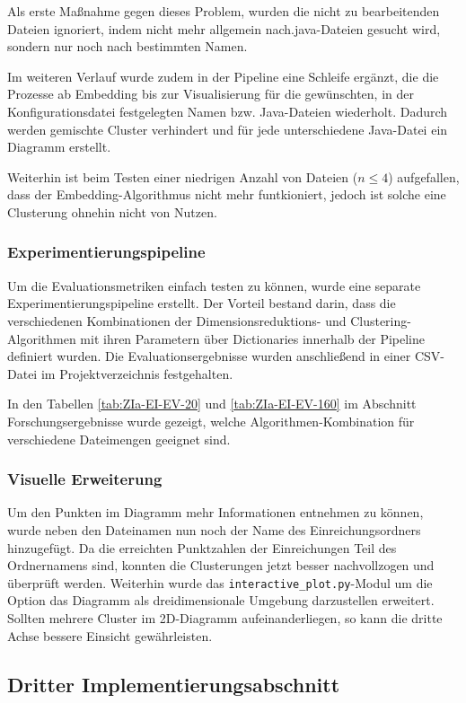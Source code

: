 Als erste Maßnahme gegen dieses Problem, wurden die nicht zu bearbeitenden Dateien ignoriert, indem nicht mehr allgemein nach.java-Dateien gesucht wird, sondern nur noch nach bestimmten Namen. 

Im weiteren Verlauf wurde zudem in der Pipeline eine Schleife ergänzt, die die Prozesse ab Embedding bis zur Visualisierung für die gewünschten, in der Konfigurationsdatei festgelegten Namen bzw. Java-Dateien wiederholt. Dadurch werden gemischte Cluster verhindert und für jede unterschiedene Java-Datei ein Diagramm erstellt.

Weiterhin ist beim Testen einer niedrigen Anzahl von Dateien (\(n \leq 4\)) aufgefallen, dass der Embedding-Algorithmus nicht mehr funtkioniert, jedoch ist solche eine Clusterung ohnehin nicht von Nutzen.


\subsubsection*{Experimentierungspipeline}
Um die Evaluationsmetriken einfach testen zu können, wurde eine separate Experimentierungspipeline erstellt. Der Vorteil bestand darin, dass die verschiedenen Kombinationen der Dimensionsreduktions- und Clustering-Algorithmen mit ihren Parametern über Dictionaries innerhalb der Pipeline definiert wurden. Die Evaluationsergebnisse wurden anschließend in einer CSV-Datei im Projektverzeichnis festgehalten.

In den Tabellen \ref{tab:ZIa-EI-EV-20} und \ref{tab:ZIa-EI-EV-160} im Abschnitt Forschungsergebnisse wurde gezeigt, welche Algorithmen-Kombination für verschiedene Dateimengen geeignet sind.


\subsubsection*{Visuelle Erweiterung}
Um den Punkten im Diagramm mehr Informationen entnehmen zu können, wurde neben den Dateinamen nun noch der Name des Einreichungsordners hinzugefügt. Da die erreichten Punktzahlen der Einreichungen Teil des Ordnernamens sind, konnten die Clusterungen jetzt besser nachvollzogen und überprüft werden. Weiterhin wurde das \texttt{interactive\_plot.py}-Modul um die Option das Diagramm als dreidimensionale Umgebung darzustellen erweitert. Sollten mehrere Cluster im 2D-Diagramm aufeinanderliegen, so kann die dritte Achse bessere Einsicht gewährleisten.


\subsection{Dritter Implementierungsabschnitt}
